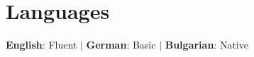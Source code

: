 \documentclass[letterpaper,11pt]{article}
\begin{document}
\section{Languages}
\begin{itemize}[leftmargin=0.15in, label={}]
  \small{\item{
        \textbf{English}{: Fluent} $|$ \textbf{German}{: Basic} $|$ \textbf{Bulgarian}{: Native}
        }}
\end{itemize}
\end{document}
